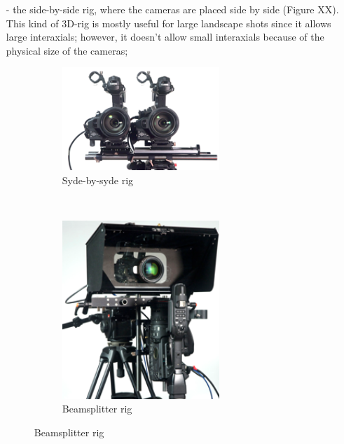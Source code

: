 \begin{itemize}
\item[-] the side-by-side rig, where the cameras are placed side by side (Figure XX). This kind of 3D-rig is mostly useful for large landscape shots since it allows large interaxials; however, it doesn't allow small interaxials because of the physical size of the cameras;

\begin{figure}[h!]
\centering
\begin{subfigure}[]{0.4\textwidth}
\centering
\includegraphics[width=0.7\textwidth]{./img/syderig.png}
\caption{\scriptsize{Syde-by-syde rig}}
\end{subfigure}%
~ %
\begin{subfigure}[]{0.25\textwidth}
\centering
\includegraphics[width=0.7\textwidth]{./img/mirrorrig.png}
\caption{\scriptsize{Beamsplitter rig}}

\end{subfigure}
\end{figure}
\end{itemize}
